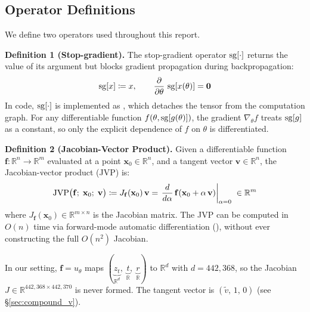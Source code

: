 
\subsection{Operator Definitions}
\label{sec:operators}

We define two operators used throughout this report.

\textbf{Definition 1 (Stop-gradient).}  The stop-gradient operator
$\operatorname{sg}[\cdot]$ returns the value of its argument but blocks gradient
propagation during backpropagation:
\begin{equation}
  \operatorname{sg}[x] \coloneqq x, \qquad
  \frac{\partial}{\partial \theta}\,\operatorname{sg}[x(\theta)] = \mathbf{0}
  \label{eq:sg_def}
\end{equation}
In code, $\operatorname{sg}[\cdot]$ is implemented as , which detaches the
tensor from the computation graph.  For any differentiable function
$f(\theta, \operatorname{sg}[g(\theta)])$, the gradient $\nabla_\theta f$ treats $\operatorname{sg}[g]$
as a constant, so only the explicit dependence of $f$ on $\theta$ is
differentiated.

\textbf{Definition 2 (Jacobian-Vector Product).}  Given a differentiable
function $\mathbf{f}: \mathbb{R}^n \to \mathbb{R}^m$ evaluated at a point
$\mathbf{x}_0 \in \mathbb{R}^n$, and a tangent vector
$\mathbf{v} \in \mathbb{R}^n$, the Jacobian-vector product (JVP) is:
\begin{equation}
  \mathrm{JVP}\bigl(\mathbf{f};\;\mathbf{x}_0;\;\mathbf{v}\bigr)
    \coloneqq J_\mathbf{f}(\mathbf{x}_0)\,\mathbf{v}
    = \left.\frac{d}{d\alpha}\,\mathbf{f}(\mathbf{x}_0 + \alpha\,\mathbf{v})
      \right|_{\alpha=0}
    \;\in \mathbb{R}^m
  \label{eq:jvp_operator}
\end{equation}
where $J_\mathbf{f}(\mathbf{x}_0) \in \mathbb{R}^{m \times n}$ is the
Jacobian matrix.  The JVP can be computed in $O(n)$ time via forward-mode
automatic differentiation (), without ever constructing
the full $O(n^2)$ Jacobian.

In our setting, $\mathbf{f} = u_\theta$ maps
$(\underbrace{z_t}_{\mathbb{R}^d},\;\underbrace{t}_{\mathbb{R}},\;
\underbrace{r}_{\mathbb{R}})$ to $\mathbb{R}^d$ with $d = 442{,}368$, so the
Jacobian $J \in \mathbb{R}^{442{,}368 \times 442{,}370}$ is never formed.
The tangent vector is $(\tilde{v},\,1,\,0)$ (see \S\ref{sec:compound_v}).